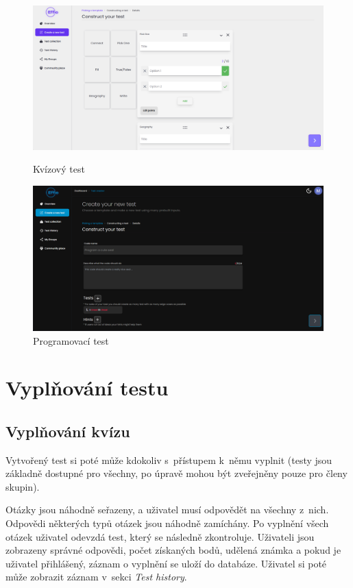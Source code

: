 \documentclass[12pt, a4paper,
openright
]{report}
\begin{document}
\begin{figure}[h]
	\centering
	\begin{minipage}[]{0.49\textwidth}
		\includegraphics[width=\textwidth]{image/test-creator1.png}
		\caption{Kvízový test}
		\label{fig:test-creator1}
	\end{minipage}
	\hfill
	\begin{minipage}[]{0.49\textwidth}
		\includegraphics[width=\textwidth]{image/test-creator2.png}
		\caption{Programovací test}
		\label{fig:test-creator2}
	\end{minipage}
\end{figure}

\section{Vyplňování testu}
\label{sec:test-take}
\subsection{Vyplňování kvízu}
Vytvořený test si poté může kdokoliv s~přístupem k~němu vyplnit (testy jsou základně dostupné pro všechny, po úpravě mohou být zveřejněny pouze pro členy skupin).

Otázky jsou náhodně seřazeny, a uživatel musí odpovědět na všechny z~nich. Odpovědi některých typů otázek jsou náhodně zamíchány. Po vyplnění všech otázek uživatel odevzdá test, který se následně zkontroluje. Uživateli jsou zobrazeny správné odpovědi, počet získaných bodů, udělená známka a pokud je uživatel přihlášený, záznam o vyplnění se uloží do databáze. Uživatel si poté může zobrazit záznam v~sekci \textit{Test history}.
\end{document}
